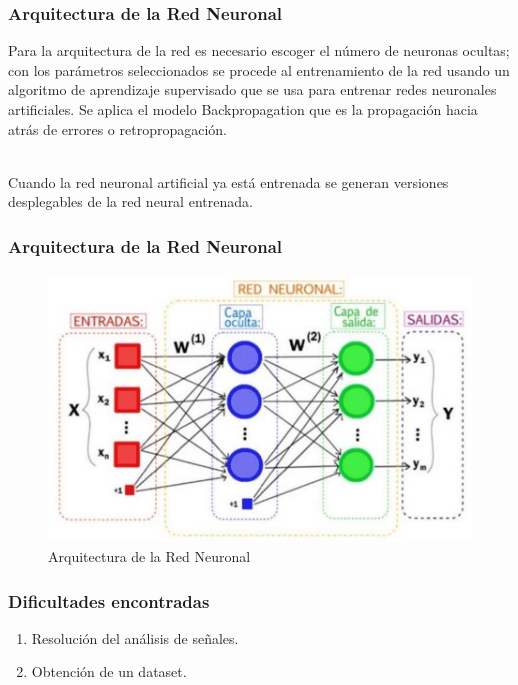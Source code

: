 \documentclass{beamer}
\begin{document}
    \begin{frame}
        \frametitle{Arquitectura de la Red Neuronal}
        \hspace*{20pt}Para la arquitectura de la red es necesario escoger el número de neuronas ocultas; con los parámetros seleccionados
         se procede al entrenamiento de la red usando un algoritmo de aprendizaje supervisado que se usa para entrenar redes neuronales 
         artificiales. Se aplica el modelo Backpropagation que es la propagación hacia atrás de errores o retropropagación.\\~\
        
        \hspace*{20pt}Cuando la red neuronal artificial ya está entrenada se generan versiones desplegables de la red neural entrenada.
        
    \end{frame} 

    \begin{frame}
        \frametitle{Arquitectura de la Red Neuronal}
        \begin{figure}
            \centering
            \includegraphics[scale=0.6]{network.jpg}
            \caption{Arquitectura de la Red Neuronal}
        \end{figure}
    \end{frame} 

    \begin{frame}
        \frametitle{Dificultades encontradas}
        \begin{enumerate}
            \item Resolución del análisis de señales.
            \item Obtención de un dataset.
        \end{enumerate}
    \end{frame} 
\end{document}
